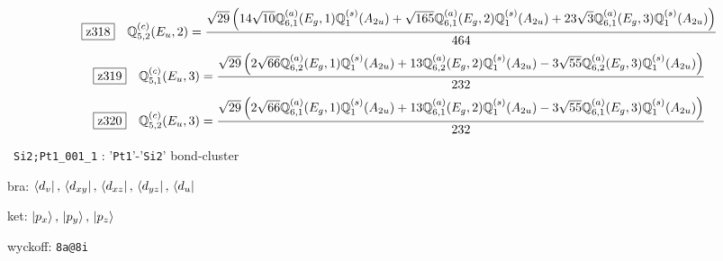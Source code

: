 \documentclass[fleqn,10pt,landscape]{jsarticle}
\begin{document}
\begin{dmath*}
\hspace*{3mm}\fbox{z318}\quad \mathbb{Q}_{5,2}^{(c)}(E_{u},2)=\frac{\sqrt{29} \left(14 \sqrt{10} \mathbb{Q}_{6,1}^{(a)}(E_{g},1) \mathbb{Q}_{1}^{(s)}(A_{2u}) + \sqrt{165} \mathbb{Q}_{6,1}^{(a)}(E_{g},2) \mathbb{Q}_{1}^{(s)}(A_{2u}) + 23 \sqrt{3} \mathbb{Q}_{6,1}^{(a)}(E_{g},3) \mathbb{Q}_{1}^{(s)}(A_{2u})\right)}{464}
\end{dmath*}
\begin{dmath*}
\hspace*{3mm}\fbox{z319}\quad \mathbb{Q}_{5,1}^{(c)}(E_{u},3)=\frac{\sqrt{29} \left(2 \sqrt{66} \mathbb{Q}_{6,2}^{(a)}(E_{g},1) \mathbb{Q}_{1}^{(s)}(A_{2u}) + 13 \mathbb{Q}_{6,2}^{(a)}(E_{g},2) \mathbb{Q}_{1}^{(s)}(A_{2u}) - 3 \sqrt{55} \mathbb{Q}_{6,2}^{(a)}(E_{g},3) \mathbb{Q}_{1}^{(s)}(A_{2u})\right)}{232}
\end{dmath*}
\begin{dmath*}
\hspace*{3mm}\fbox{z320}\quad \mathbb{Q}_{5,2}^{(c)}(E_{u},3)=\frac{\sqrt{29} \left(2 \sqrt{66} \mathbb{Q}_{6,1}^{(a)}(E_{g},1) \mathbb{Q}_{1}^{(s)}(A_{2u}) + 13 \mathbb{Q}_{6,1}^{(a)}(E_{g},2) \mathbb{Q}_{1}^{(s)}(A_{2u}) - 3 \sqrt{55} \mathbb{Q}_{6,1}^{(a)}(E_{g},3) \mathbb{Q}_{1}^{(s)}(A_{2u})\right)}{232}
\end{dmath*}
\vspace{5mm}

\noindent\textbullet\, \texttt{Si2;Pt1_001_1} : '\texttt{Pt1}'-'\texttt{Si2}' bond-cluster

\noindent\quad * bra: $\bra{d_{v}},\, \bra{d_{xy}},\, \bra{d_{xz}},\, \bra{d_{yz}},\, \bra{d_{u}}$

\noindent\quad * ket: $\ket{p_{x}},\, \ket{p_{y}},\, \ket{p_{z}}$

\noindent\quad * wyckoff: \texttt{8a@8i}
\end{document}
